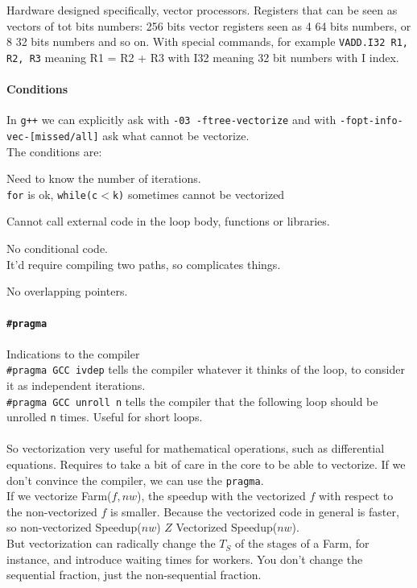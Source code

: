 \documentclass[10pt]{report}
\begin{document}
Hardware designed specifically, vector processors. Registers that can be seen as vectors of tot bits numbers: 256 bits vector registers seen as 4 64 bits numbers, or 8 32 bits numbers and so on. With special commands, for example \texttt{VADD.I32 R1, R2, R3} meaning R1 = R2 + R3 with I32 meaning 32 bit numbers with I index.
\paragraph{Conditions} In \texttt{g++} we can explicitly ask with \texttt{-03 -ftree-vectorize} and with \texttt{-fopt-info-vec-[missed/all]} ask what cannot be vectorize.\\
The conditions are:
\begin{list}{}{}
	\item Need to know the number of iterations.\\
	\texttt{for} is ok, \texttt{while(c$<$k)} sometimes cannot be vectorized
	\item Cannot call external code in the loop body, functions or libraries.
	\item No conditional code.\\
	It'd require compiling two paths, so complicates things.
	\item No overlapping pointers.\\
	
\end{list}
\paragraph{\texttt{\#pragma}} Indications to the compiler\\
\texttt{\#pragma GCC ivdep} tells the compiler whatever it thinks of the loop, to consider it as independent iterations.\\
\texttt{\#pragma GCC unroll n} tells the compiler that the following loop should be unrolled \texttt{n} times. Useful for short loops.\\\\
So vectorization very useful for mathematical operations, such as differential equations. Requires to take a bit of care in the core to be able to vectorize. If we don't convince the compiler, we can use the \texttt{pragma}.\\
If we vectorize Farm($f,nw$), the speedup with the vectorized $f$ with respect to the non-vectorized $f$ is smaller. Because the vectorized code in general is faster, so non-vectorized Speedup($nw$) $Z$ Vectorized Speedup($nw$).\\
But vectorization can radically change the $T_S$ of the stages of a Farm, for instance, and introduce waiting times for workers. You don't change the sequential fraction, just the non-sequential fraction.
\end{document}
